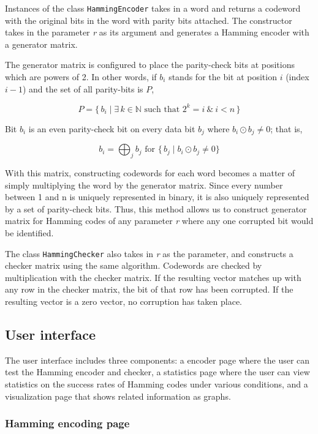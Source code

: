 \documentclass[11pt, oneside]{article}   	%
\begin{document}
Instances of the class \verb|HammingEncoder| takes in a word and returns a codeword with the original bits in the word with parity bits attached. The constructor takes in the parameter \textit{r} as its argument and generates a Hamming encoder with a generator matrix.

The generator matrix is configured to place the parity-check bits at positions which are powers of 2. In other words, if $b_i$ stands for the bit at position $i$ (index $i-1$) and the set of all parity-bits is $P$, 

$$
P = \{\,b_i \mid \exists \, k \in \mathbb{N} \text{ such that } 2^k = i \ \& \ i < n \, \}
$$

Bit $b_i$ is an even parity-check bit on every data bit $b_j$ where $b_i \odot b_j \neq 0$; that is, 

$$
b_i = \bigoplus_{j}b_j \text{ for } \{\,b_j \mid b_i \odot b_j \neq 0\} 
$$

With this matrix, constructing codewords for each word becomes a matter of simply multiplying the word by the generator matrix. Since every number between 1 and n is uniquely represented in binary, it is also uniquely represented by a set of parity-check bits. Thus, this method allows us to construct generator matrix for Hamming codes of any parameter \textit{r} where any one corrupted bit would be identified.

The class \verb!HammingChecker! also takes in \textit{r} as the parameter, and constructs a checker matrix using the same algorithm. Codewords are checked by multiplication with the checker matrix. If the resulting vector matches up with any row in the checker matrix, the bit of that row has been corrupted. If the resulting vector is a zero vector, no corruption has taken place. 

\subsection*{User interface}

The user interface includes three components: a encoder page where the user can test the Hamming encoder and checker, a statistics page where the user can view statistics on the success rates of Hamming codes under various conditions, and a visualization page that shows related information as graphs.

\subsubsection*{Hamming encoding page}
\end{document}

